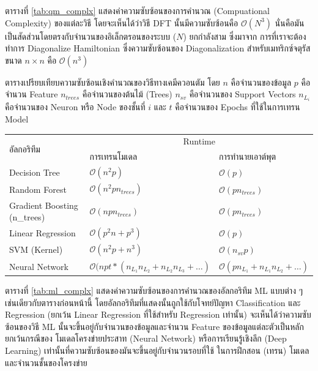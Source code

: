 ตารางที่ \ref{tab:qm_complx} แสดงค่าความซับซ้อนของการคำนวณ (Compuational Complexity) ของแต่ละวิธี โดยจะเห็นได้ว่าวิธี DFT 
นั้นมีความซับซ้อนคือ $\mathcal{O}(N^{3})$ นั่นคือมันเป็นสัดส่วนโดยตรงกับจำนวนของอิเล็กตรอนของระบบ ($N$) ยกกำลังสาม ซึ่งมาจาก%
การที่เราจะต้องทำการ Diagonalize Hamiltonian ซึ่งความซับซ้อนของ Diagonalization สำหรับเมทริกซ์จตุรัสขนาด $n \times n$ คือ 
$\mathcal{O}(n^{3})$

\begin{adjustwidth}{-2.5 cm}{-2.5 cm}
    \centering
    \begin{threeparttable}[H]
    \caption{ตารางเปรียบเทียบความซับซ้อนเชิงคำนวณของวิธีทางเคมีควอนตัม\autocite{zotero-328} โดย $n$ คือจำนวนของข้อมูล $p$ 
    คือจำนวน Feature $n_{trees}$ คือจำนวนของต้นไม้ (Trees) $n_{sv}$ คือจำนวนของ Support Vectors $n_{L_{i}}$ 
    คือจำนวนของ Neuron หรือ Node ของชั้นที่ $i$ และ $t$ คือจำนวนของ Epochs ที่ใช้ในการเทรน Model}
    \label{tab:ml_complx}
    \small
    \begin{tabular}{lll}\toprule
    \multirow{2}{*}{อัลกอริทึม} &\multicolumn{2}{c}{Runtime} \\\cmidrule{2-3}
    &การเทรนโมเดล &การทำนายเอาต์พุต\\\midrule
    Decision Tree &$\mathcal{O}(n^{2}p)$ &$\mathcal{O}(p)$ \\
    Random Forest &$\mathcal{O}(n^{2}pn_{trees})$ &$\mathcal{O}(pn_{trees})$ \\
    Gradient Boosting (n\_{trees}) &$\mathcal{O}(npn_{trees})$ &$\mathcal{O}(pn_{trees})$ \\
    Linear Regression &$\mathcal{O}(p^{2}n+p^{3})$ &$\mathcal{O}(p)$ \\
    SVM (Kernel) &$\mathcal{O}(n^{2}p+n^{3})$ &$\mathcal{O}(n_{sv}p)$ \\
    Neural Network &$\mathcal{O}(npt*(n_{L_{1}}n_{L_{2}}+ n_{L_{2}}n_{L_{3}} + \dots)$ &$\mathcal{O}(pn_{L_{1}} 
    + n_{L_{1}}n_{L_{2}}+ \dots)$ \\
    \bottomrule
    \end{tabular}
\end{threeparttable}
\end{adjustwidth}

ตารางที่ \ref{tab:ml_complx} แสดงค่าความซับซ้อนของการคำนวณของอัลกอริทึม ML แบบต่าง ๆ เช่นเดียวกับตารางก่อนหน้านี้ 
โดยอัลกอริทึมที่แสดงนั้นถูกใช้กับโจทย์ปัญหา Classification และ Regression (ยกเว้น Linear Regression ที่ใช้สำหรับ Regression 
เท่านั้น) จะเห็นได้ว่าความซับซ้อนของวิธี ML นั้นจะขึ้นอยู่กับจำนวนของข้อมูลและจำนวน Feature ของข้อมูลแต่ละตัวเป็นหลัก ยกเว้นกรณีของ
โมเดลโครงข่ายประสาท (Neural Network) หรือการเรียนรู้เชิงลึก (Deep Learning) เท่านั้นที่ความซับซ้อนของมันจะขึ้นอยู่กับจำนวนรอบที่ใช้%
ในการฝึกสอน (เทรน) โมเดลและจำนวนชั้นของโครงข่าย

